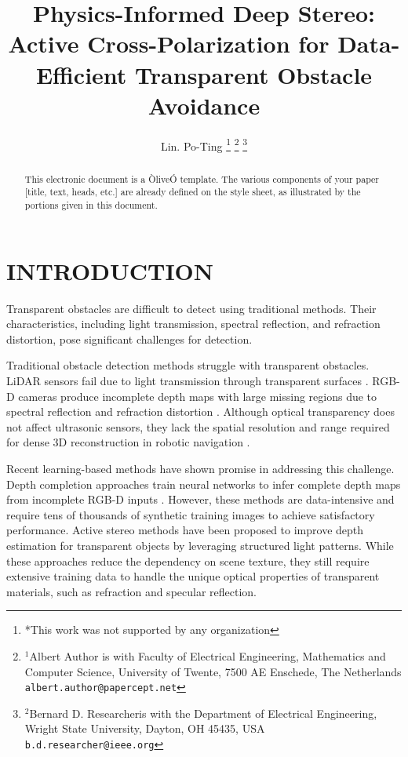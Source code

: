 \documentclass[letterpaper, 10 pt, conference]{ieeeconf}  %
\title{\LARGE \bf
Physics-Informed Deep Stereo: Active Cross-Polarization 
for Data-Efficient Transparent Obstacle Avoidance
}
\author{Lin. Po-Ting 
\thanks{*This work was not supported by any organization}%
\thanks{$^{1}$Albert Author is with Faculty of Electrical Engineering, Mathematics and Computer Science,
        University of Twente, 7500 AE Enschede, The Netherlands
        {\tt\small albert.author@papercept.net}}%
\thanks{$^{2}$Bernard D. Researcheris with the Department of Electrical Engineering, Wright State University,
        Dayton, OH 45435, USA
        {\tt\small b.d.researcher@ieee.org}}%
}
\begin{document}
\maketitle
\thispagestyle{empty}
\pagestyle{empty}


\begin{abstract}

This electronic document is a ÒliveÓ template. The various components of your paper [title, text, heads, etc.] are already defined on the style sheet, as illustrated by the portions given in this document.

\end{abstract}


\section{INTRODUCTION}

Transparent obstacles are difficult to detect using traditional methods. Their characteristics, including light transmission, spectral reflection, and refraction distortion, pose significant challenges for detection.

Traditional obstacle detection methods struggle with transparent obstacles. 
LiDAR sensors fail due to light transmission through transparent surfaces 
\cite{tibebu_lidar-based_2021}. RGB-D cameras produce incomplete depth maps with large missing regions due to spectral reflection 
and refraction distortion \cite{lysenkov_recognition_2013}. Although optical transparency does not affect 
ultrasonic sensors, they lack the spatial resolution and range required for dense 3D reconstruction in robotic navigation \cite{borenstein_vector_1991}.

Recent learning-based methods have shown promise in addressing this challenge. 
Depth completion approaches train neural networks to infer complete depth maps 
from incomplete RGB-D inputs \cite{sajjan_clear_2020}.
However, these methods are data-intensive and require tens of thousands of 
synthetic training images to achieve satisfactory performance. Active stereo methods \cite{shi_asgrasp_2024} have been proposed to improve depth estimation 
for transparent objects by leveraging structured light patterns. While these 
approaches reduce the dependency on scene texture, they still require extensive 
training data to handle the unique optical properties of transparent materials, 
such as refraction and specular reflection.
\end{document}
